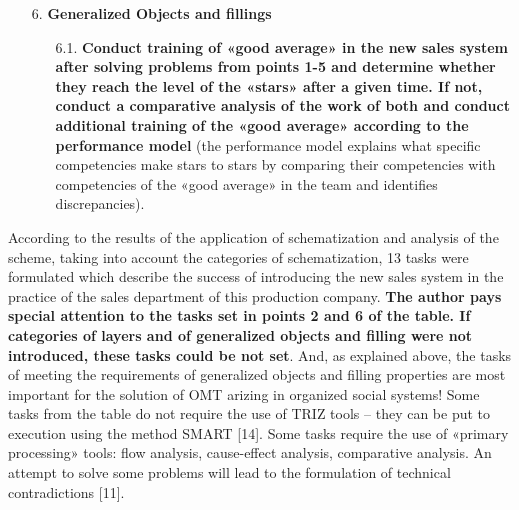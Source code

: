 \documentclass[11pt,a4paper]{book}
\begin{document}
\begin{itemize}
\begin{itemize}
{      «brakemen»?}
  \item [5.2.]  Customer groups, what follows from the analysis of the task
    2.2. \textbf{Divide customers into categories A, B and C. Define customer
      categories and target customer groups, for which the new sales system is
      redundant. Set a task to synchronize the work of the department, which
      should apply both sales systems, if the hypothesis is confirmed that the
      existing sales system would be appropriate to be maintained for certain
      customer groups amid the introduction of the new one.}
  \end{itemize}
\item [6.] \textbf{Generalized Objects and fillings}
  \begin{itemize}
  \item [6.1.]  \textbf{Conduct training of «good average» in the new sales
    system after solving problems from points 1-5 and determine whether they
    reach the level of the «stars» after a given time. If not, conduct a
    comparative analysis of the work of both and conduct additional training
    of the «good average» according to the performance model} (the performance
    model explains what specific competencies make stars to stars by comparing
    their competencies with competencies of the «good average» in the team and
    identifies discrepancies).
  \end{itemize}
\end{itemize}

According to the results of the application of schematization and analysis of
the scheme, taking into account the categories of schematization, 13 tasks
were formulated which describe the success of introducing the new sales system
in the practice of the sales department of this production company.
\textbf{The author pays special attention to the tasks set in points 2 and 6
  of the table. If categories of layers and of generalized objects and filling
  were not introduced, these tasks could be not set}. And, as explained above,
the tasks of meeting the requirements of generalized objects and filling
properties are most important for the solution of OMT arizing in organized
social systems!  Some tasks from the table do not require the use of TRIZ
tools -- they can be put to execution using the method SMART [14]. Some tasks
require the use of «primary processing» tools: flow analysis, cause-effect
analysis, comparative analysis.  An attempt to solve some problems will lead
to the formulation of technical contradictions [11].
\end{document}
